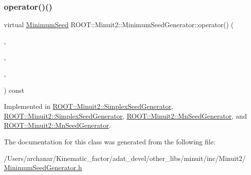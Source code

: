 \subsubsection{\texorpdfstring{operator()()}{operator()()}\hspace{0.1cm}{\footnotesize\ttfamily [4/4]}}
{\footnotesize\ttfamily virtual \mbox{\hyperlink{classROOT_1_1Minuit2_1_1MinimumSeed}{Minimum\+Seed}} R\+O\+O\+T\+::\+Minuit2\+::\+Minimum\+Seed\+Generator\+::operator() (\begin{DoxyParamCaption}\item[{const \mbox{\hyperlink{classROOT_1_1Minuit2_1_1MnFcn}{Mn\+Fcn}} \&}]{,  }\item[{const \mbox{\hyperlink{classROOT_1_1Minuit2_1_1AnalyticalGradientCalculator}{Analytical\+Gradient\+Calculator}} \&}]{,  }\item[{const \mbox{\hyperlink{classROOT_1_1Minuit2_1_1MnUserParameterState}{Mn\+User\+Parameter\+State}} \&}]{,  }\item[{const \mbox{\hyperlink{classROOT_1_1Minuit2_1_1MnStrategy}{Mn\+Strategy}} \&}]{ }\end{DoxyParamCaption}) const\hspace{0.3cm}{\ttfamily [pure virtual]}}



Implemented in \mbox{\hyperlink{classROOT_1_1Minuit2_1_1SimplexSeedGenerator_abce591c5a1e1aa0882dd5b474530efce}{R\+O\+O\+T\+::\+Minuit2\+::\+Simplex\+Seed\+Generator}}, \mbox{\hyperlink{classROOT_1_1Minuit2_1_1SimplexSeedGenerator_a483dc9272be849a23bcd0d29ac4e3b94}{R\+O\+O\+T\+::\+Minuit2\+::\+Simplex\+Seed\+Generator}}, \mbox{\hyperlink{classROOT_1_1Minuit2_1_1MnSeedGenerator_a300ecb8a37b30fc5bd13c353f3338a92}{R\+O\+O\+T\+::\+Minuit2\+::\+Mn\+Seed\+Generator}}, and \mbox{\hyperlink{classROOT_1_1Minuit2_1_1MnSeedGenerator_aeba9e3b985e5d74e797cafaffec74de3}{R\+O\+O\+T\+::\+Minuit2\+::\+Mn\+Seed\+Generator}}.



The documentation for this class was generated from the following file\+:\begin{DoxyCompactItemize}
\item 
/\+Users/archanar/\+Kinematic\+\_\+factor/adat\+\_\+devel/other\+\_\+libs/minuit/inc/\+Minuit2/\mbox{\hyperlink{other__libs_2minuit_2inc_2Minuit2_2MinimumSeedGenerator_8h}{Minimum\+Seed\+Generator.\+h}}\end{DoxyCompactItemize}

